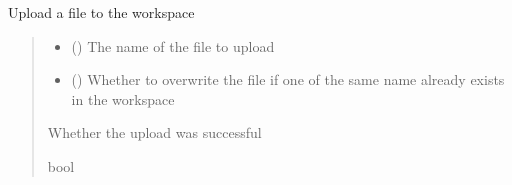\documentclass[letterpaper,10pt,english]{sphinxmanual}
\begin{document}
\begin{fulllineitems}
\begin{fulllineitems}
\begin{quote}
\begin{description}
\end{description}\end{quote}

\end{fulllineitems}


\begin{fulllineitems}
\label{\detokenize{aisquared.platform:aisquared.platform.DatabricksClient.DatabricksClient.upload_to_workspace}}
\pysigstartsignatures
{}
\pysigstopsignatures
\sphinxAtStartPar
Upload a file to the workspace
\begin{quote}\begin{description}
\begin{itemize}
\item {} 
\sphinxAtStartPar
{} () \textendash{} The name of the file to upload

\item {} 
\sphinxAtStartPar
{} (\sphinxstyleliteralemphasis{\sphinxupquote{ (}}\sphinxstyleliteralemphasis{\sphinxupquote{)}}) \textendash{} Whether to overwrite the file if one of the same name already
exists in the workspace

\end{itemize}

\sphinxAtStartPar
{} \textendash{} Whether the upload was successful

\sphinxAtStartPar
bool

\end{description}\end{quote}

\end{fulllineitems}


\end{fulllineitems}
\end{document}
